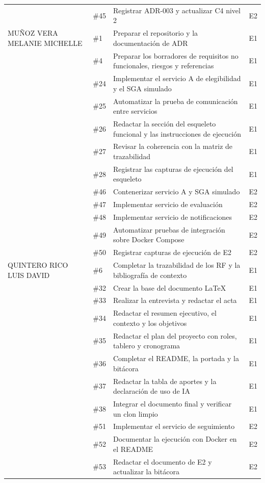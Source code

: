 \begin{longtable}{@{}>{\raggedright\arraybackslash}p{}>{\raggedright\arraybackslash}p{}>{\raggedright\arraybackslash}p{}>{\raggedright\arraybackslash}p{}@{}}
 & \#45 & Registrar ADR-003 y actualizar C4 nivel 2 & E2\\
\addlinespace
MUÑOZ VERA MELANIE MICHELLE & \#1 & Preparar el repositorio y la documentación de ADR & E1\\
 & \#4 & Preparar los borradores de requisitos no funcionales, riesgos y referencias & E1\\
 & \#24 & Implementar el servicio A de elegibilidad y el SGA simulado & E1\\
 & \#25 & Automatizar la prueba de comunicación entre servicios & E1\\
 & \#26 & Redactar la sección del esqueleto funcional y las instrucciones de ejecución & E1\\
 & \#27 & Revisar la coherencia con la matriz de trazabilidad & E1\\
 & \#28 & Registrar las capturas de ejecución del esqueleto & E1\\
 & \#46 & Contenerizar servicio A y SGA simulado & E2\\
 & \#47 & Implementar servicio de evaluación & E2\\
 & \#48 & Implementar servicio de notificaciones & E2\\
 & \#49 & Automatizar pruebas de integración sobre Docker Compose & E2\\
 & \#50 & Registrar capturas de ejecución de E2 & E2\\
\addlinespace
QUINTERO RICO LUIS DAVID & \#6 & Completar la trazabilidad de los RF y la bibliografía de contexto & E1\\
 & \#32 & Crear la base del documento LaTeX & E1\\
 & \#33 & Realizar la entrevista y redactar el acta & E1\\
 & \#34 & Redactar el resumen ejecutivo, el contexto y los objetivos & E1\\
 & \#35 & Redactar el plan del proyecto con roles, tablero y cronograma & E1\\
 & \#36 & Completar el README, la portada y la bitácora & E1\\
 & \#37 & Redactar la tabla de aportes y la declaración de uso de IA & E1\\
 & \#38 & Integrar el documento final y verificar un clon limpio & E1\\
 & \#51 & Implementar el servicio de seguimiento & E2\\
 & \#52 & Documentar la ejecución con Docker en el README & E2\\
 & \#53 & Redactar el documento de E2 y actualizar la bitácora & E2\\
\end{longtable}
\endgroup

